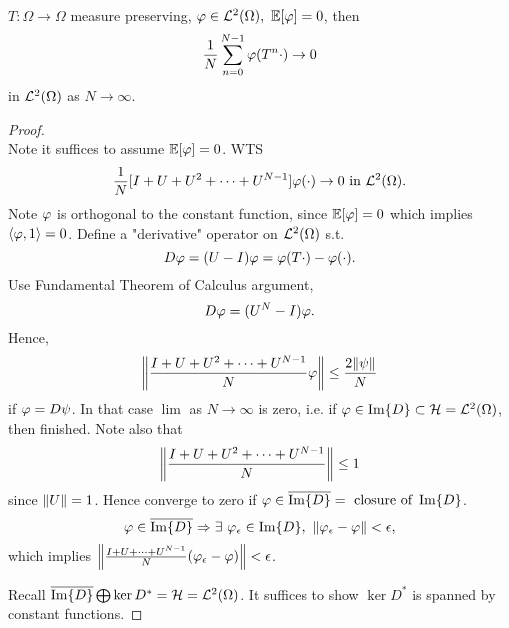 \begin{proposition}\ \\
$T: \Omega \to \Omega$ measure preserving, $\vphi \in \Ls^2(\Omega),\ \E[\vphi] = 0$, then
\begin{equation*}
    \frac{1}{N} \sum\limits_{n = 0}^{N - 1} \varphi(T^n \cdot) \to 0
\end{equation*}
in $\mathcal{L}^2(\Omega)$ as $N \to \infty$. 
\end{proposition}
\begin{proof}\ \\
Note it suffices to assume $\mathbb{E}[\varphi] = 0$. WTS 
\begin{equation*}
     \frac{1}{N} [I + U + U^2 + \dots + U^{N-1}] \varphi(\cdot) \to 0 \text{ in } \mathcal{L}^2(\Omega).
\end{equation*}
Note $\varphi$ is orthogonal to the constant function, since $\mathbb{E}[\varphi] = 0$ which implies $\left\langle \varphi, 1 \right\rangle = 0$. Define a "derivative" operator on $\mathcal{L}^2(\Omega)$ s.t.
\begin{equation*}
    D \varphi = (U - I) \varphi = \varphi(T \cdot) - \varphi(\cdot).
\end{equation*}
Use Fundamental Theorem of Calculus argument,
\begin{equation*}
    [I + U + U^2 + \dots + U^{N-1}] D\vphi = (U^N - I) \vphi.
\end{equation*}
Hence,
\begin{equation*}
    \norm{\frac{I + U + U^2 + \dots + U^{N-1}}{N} \varphi} \leq \frac{2 \norm{\psi}}{N}
\end{equation*}
if $\varphi = D \psi$. In that case $\lim$ as $N \to \infty$ is zero, i.e. if $\varphi \in \Im{D} \subset \mathcal{H} = \mathcal{L}^2(\Omega)$, then finished. Note also that
\begin{equation*}
    \norm{\frac{I + U + U^2 + \dots + U^{N-1}}{N}} \leq 1
\end{equation*}
since $\norm{U} = 1$. Hence converge to zero if $\varphi \in \overline{\Im{D}} = \text{ closure of } \Im{D}$. 
\begin{equation*}
    \vphi \in \bar{\Im{D}} \Rightarrow \exists\ \vphi_\ep \in \Im{D},\ \norm{\vphi_\ep - \vphi} < \ep,
\end{equation*}
which implies $\norm{\frac{I + U + \dots + U^{N-1}}{N} (\varphi_\epsilon - \varphi)} < \epsilon$.

\np Recall $\overline{\Im{D}} \bigoplus \ker{D^*} = \mathcal{H} = \mathcal{L}^2(\Omega)$. It suffices to show $\ker{D^*}$ is spanned by constant functions. 


\end{proof}
